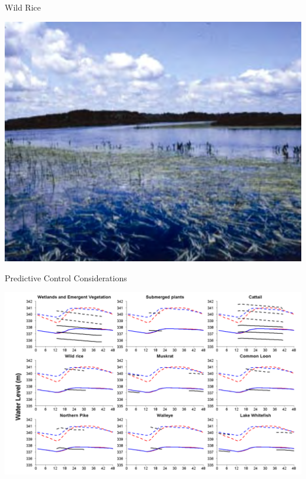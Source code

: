 \documentclass[compress,english]{beamer}
\begin{document}
\begin{frame}{Wild Rice}

\begin{center}
\includegraphics[width=0.8\paperwidth]{MorinWR.png}
\end{center}

\end{frame}

\begin{frame}{Predictive Control Considerations}

\begin{center}
\includegraphics[width=0.8\paperwidth]{MorinRC.png}
\end{center}

\end{frame}
\end{document}
